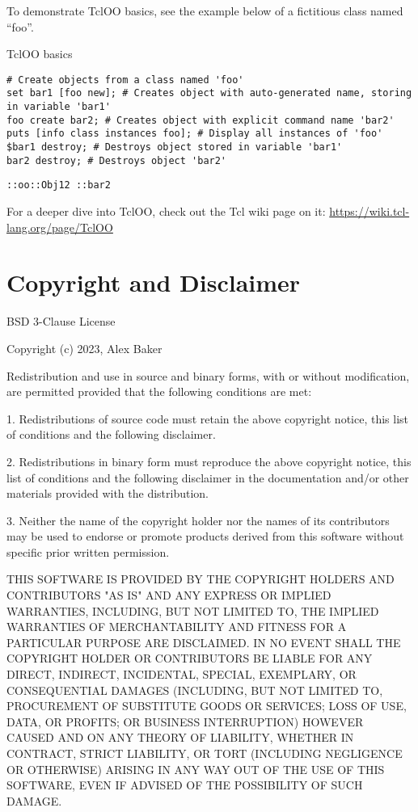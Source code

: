 To demonstrate TclOO basics, see the example below of a fictitious class named ``foo''.
\begin{example}{TclOO basics}
\begin{lstlisting}
# Create objects from a class named 'foo'
set bar1 [foo new]; # Creates object with auto-generated name, storing in variable 'bar1'
foo create bar2; # Creates object with explicit command name 'bar2'
puts [info class instances foo]; # Display all instances of 'foo'
$bar1 destroy; # Destroys object stored in variable 'bar1'
bar2 destroy; # Destroys object 'bar2'
\end{lstlisting}
\tcblower
\begin{lstlisting}
::oo::Obj12 ::bar2
\end{lstlisting}
\end{example}
For a deeper dive into TclOO, check out the Tcl wiki page on it: \hyperlink{https://wiki.tcl-lang.org/page/TclOO}{https://wiki.tcl-lang.org/page/TclOO}

\cleartooddpage[\thispagestyle{empty}]
\section{Copyright and Disclaimer}
BSD 3-Clause License

Copyright (c) 2023, Alex Baker

Redistribution and use in source and binary forms, with or without
modification, are permitted provided that the following conditions are met:

1. Redistributions of source code must retain the above copyright notice, this
   list of conditions and the following disclaimer.

2. Redistributions in binary form must reproduce the above copyright notice,
   this list of conditions and the following disclaimer in the documentation
   and/or other materials provided with the distribution.

3. Neither the name of the copyright holder nor the names of its
   contributors may be used to endorse or promote products derived from
   this software without specific prior written permission.

THIS SOFTWARE IS PROVIDED BY THE COPYRIGHT HOLDERS AND CONTRIBUTORS "AS IS"
AND ANY EXPRESS OR IMPLIED WARRANTIES, INCLUDING, BUT NOT LIMITED TO, THE
IMPLIED WARRANTIES OF MERCHANTABILITY AND FITNESS FOR A PARTICULAR PURPOSE ARE
DISCLAIMED. IN NO EVENT SHALL THE COPYRIGHT HOLDER OR CONTRIBUTORS BE LIABLE
FOR ANY DIRECT, INDIRECT, INCIDENTAL, SPECIAL, EXEMPLARY, OR CONSEQUENTIAL
DAMAGES (INCLUDING, BUT NOT LIMITED TO, PROCUREMENT OF SUBSTITUTE GOODS OR
SERVICES; LOSS OF USE, DATA, OR PROFITS; OR BUSINESS INTERRUPTION) HOWEVER
CAUSED AND ON ANY THEORY OF LIABILITY, WHETHER IN CONTRACT, STRICT LIABILITY,
OR TORT (INCLUDING NEGLIGENCE OR OTHERWISE) ARISING IN ANY WAY OUT OF THE USE
OF THIS SOFTWARE, EVEN IF ADVISED OF THE POSSIBILITY OF SUCH DAMAGE.
